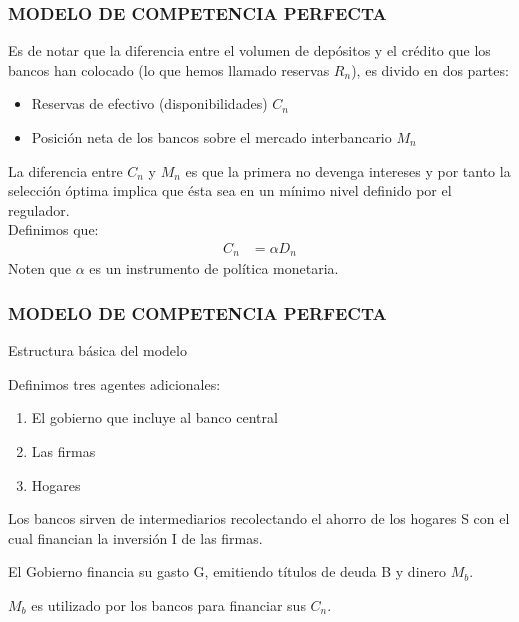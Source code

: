 \begin{frame}\frametitle{{\normalsize MODELO DE COMPETENCIA PERFECTA} {}}
    
    Es de notar que la diferencia entre el volumen de depósitos y el crédito que los bancos han colocado (lo que hemos llamado reservas $R_{n}$), es divido en dos partes:
    \begin{itemize}
        \item Reservas de efectivo (disponibilidades) $C_{n}$
        \item Posición neta de los bancos sobre el mercado interbancario $M_{n}$
    \end{itemize}
    La diferencia entre $C_{n}$ y $M_{n}$ es que la primera no devenga intereses y por tanto la selección óptima implica que ésta sea en un mínimo nivel definido por el regulador.\\
    Definimos que:
    \begin{align}
    C_{n}&=\alpha D_{n}\nonumber
    \end{align} 
    Noten que $\alpha$ es un instrumento de política monetaria.
    
    


            
\end{frame}


\begin{frame}\frametitle{{\normalsize MODELO DE COMPETENCIA PERFECTA} {}}

\begin{block} {Estructura básica del modelo}
\begin{description}
    \item[Supuesto 5] Definimos tres agentes adicionales:
    \begin{enumerate}
        \item El gobierno que incluye al banco central
        \item Las firmas
        \item Hogares
    \end{enumerate}  
    \item Los bancos sirven de intermediarios recolectando el ahorro de los hogares S con el cual financian la inversión I de las firmas.
    \item El Gobierno financia su gasto G, emitiendo títulos de deuda B y dinero $M_{b}$.
    \item $M_{b}$ es utilizado por los bancos para financiar sus $C_{n}$.
     
        
\end{description}

\end{block}	

\end{frame}

